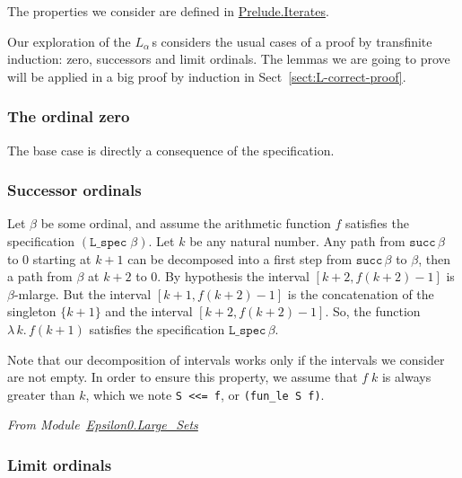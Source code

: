 The properties we consider are defined in \href{../theories/html/hydras.Prelude.Iterates.html\#fun_le}{Prelude.Iterates}.

\label{sect:abstract-arith-prop}



Our exploration of the $L_\alpha$\,s  considers the usual cases of a proof by transfinite induction: zero, successors and limit ordinals. The lemmas we are going to prove will be applied in a big proof by induction in Sect~\vref{sect:L-correct-proof}.


\subsubsection{The  ordinal zero}
\label{sect:L-spec-zero}
The base case is directly a consequence of the specification.




\subsubsection{Successor ordinals}
\label{sect:L-spec-succ}
Let $\beta$ be some ordinal, and assume the arithmetic function $f$ satisfies 
the specification $(\texttt{L\_spec}\;\beta)$.  Let $k$ be any natural number.
Any path from $\texttt{succ}\,\beta$ to $0$ starting at $k+1$ can be decomposed into a first step from $\texttt{succ}\,\beta$ to $\beta$, then a path from
$\beta$ at $k+2$ to $0$. 
By hypothesis the interval $[k+2, f(k+2)-1]$ is $\beta$-mlarge.
But the interval $[k+1, f(k+2)-1]$ is the concatenation of the singleton
$\{k+1\}$ and the interval $[k+2, f(k+2)-1]$.
So, the function $\lambda\,k.\,f(k+1)$ satisfies the specification $\texttt{L\_spec}\,\beta$.


Note that our decomposition of intervals works only if the intervals we consider are not empty. In order to ensure this property, we assume that $f\;k$ is always greater than $k$, which we note \texttt{S <<= f}, or \texttt{(fun\_le S f)}.



\emph{From Module~\href{../theories/html/hydras.Epsilon0.Large_Sets.html}{Epsilon0.Large\_Sets}}




\subsubsection{Limit ordinals}
\label{sect:L-spec-lim}

